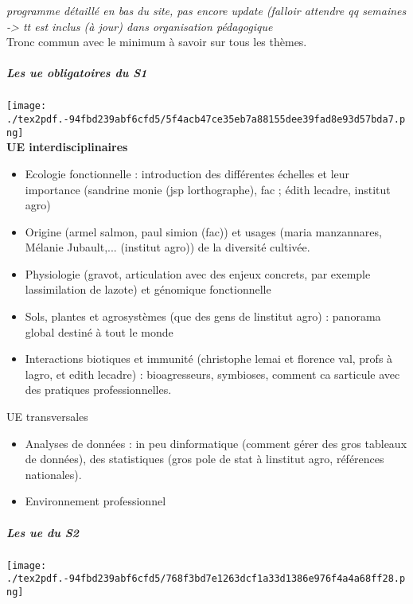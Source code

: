 \documentclass[
]{article}
\providecommand{\tightlist}{%
  \setlength{\itemsep}{0pt}\setlength{\parskip}{0pt}}
\begin{document}
\emph{programme détaillé en bas du site, pas encore update (falloir
attendre qq semaines -\textgreater{} tt est inclus (à jour) dans
organisation pédagogique}\\
Tronc commun avec le minimum à savoir sur tous les thèmes.

\hypertarget{les-ue-obligatoires-du-s1}{%
\subparagraph{Les ue obligatoires du
S1}\label{les-ue-obligatoires-du-s1}}

\texttt{[image: ./tex2pdf.-94fbd239abf6cfd5/5f4acb47ce35eb7a88155dee39fad8e93d57bda7.png]}\\
\textbf{UE interdisciplinaires}

\begin{itemize}
\tightlist
\item
  Ecologie fonctionnelle : introduction des différentes échelles et leur
  importance (sandrine monie (jsp l\textquotesingle orthographe), fac ;
  édith lecadre, institut agro)
\item
  Origine (armel salmon, paul simion (fac)) et usages (maria
  manzannares, Mélanie Jubault,... (institut agro)) de la diversité
  cultivée.
\item
  Physiologie (gravot, articulation avec des enjeux concrets, par
  exemple l\textquotesingle assimilation de l\textquotesingle azote) et
  génomique fonctionnelle
\item
  Sols, plantes et agrosystèmes (que des gens de
  l\textquotesingle institut agro) : panorama global destiné à tout le
  monde
\item
  Interactions biotiques et immunité (christophe lemai et florence val,
  profs à l\textquotesingle agro, et edith lecadre) : bioagresseurs,
  symbioses, comment ca s\textquotesingle articule avec des pratiques
  professionnelles.
\end{itemize}

UE transversales

\begin{itemize}
\tightlist
\item
  Analyses de données : in peu d\textquotesingle informatique (comment
  gérer des gros tableaux de données), des statistiques (gros pole de
  stat à l\textquotesingle institut agro, références nationales).
\item
  Environnement professionnel
\end{itemize}

\hypertarget{les-ue-du-s2}{%
\subparagraph{Les ue du S2}\label{les-ue-du-s2}}

\texttt{[image: ./tex2pdf.-94fbd239abf6cfd5/768f3bd7e1263dcf1a33d1386e976f4a4a68ff28.png]}
\end{document}
